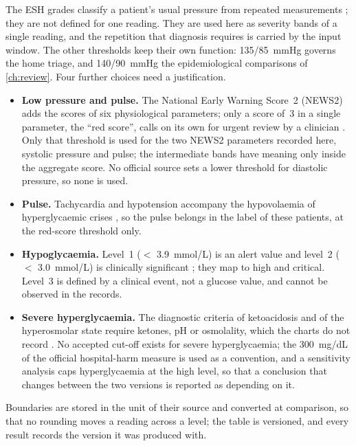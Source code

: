 \documentclass[11pt,a4paper,oneside]{report}
\begin{document}
The ESH grades classify a patient's usual pressure from repeated measurements \parencite{mancia2023}; they are not defined for one reading. They are used here as severity bands of a single reading, and the repetition that diagnosis requires is carried by the input window. The other thresholds keep their own function: 135/85~mmHg governs the home triage, and 140/90~mmHg the epidemiological comparisons of \cref{ch:review}. Four further choices need a justification.
\begin{itemize}
  \item \textbf{Low pressure and pulse.} The National Early Warning Score~2 (NEWS2) adds the scores of six physiological parameters; only a score of~3 in a single parameter, the ``red score'', calls on its own for urgent review by a clinician \parencite{rcp2017news2}. Only that threshold is used for the two NEWS2 parameters recorded here, systolic pressure and pulse; the intermediate bands have meaning only inside the aggregate score. No official source sets a lower threshold for diastolic pressure, so none is used.
  \item \textbf{Pulse.} Tachycardia and hypotension accompany the hypovolaemia of hyperglycaemic crises \parencite{umpierrez2024}, so the pulse belongs in the label of these patients, at the red-score threshold only.
  \item \textbf{Hypoglycaemia.} Level~1 ($<$ 3.9~mmol/L) is an alert value and level~2 ($<$ 3.0~mmol/L) is clinically significant \parencite{ihsg2017}; they map to high and critical. Level~3 is defined by a clinical event, not a glucose value, and cannot be observed in the records.
  \item \textbf{Severe hyperglycaemia.} The diagnostic criteria of ketoacidosis and of the hyperosmolar state require ketones, pH or osmolality, which the charts do not record \parencite{umpierrez2024}. No accepted cut-off exists for severe hyperglycaemia; the 300~mg/dL of the official hospital-harm measure \parencite{cms871} is used as a convention, and a sensitivity analysis caps hyperglycaemia at the high level, so that a conclusion that changes between the two versions is reported as depending on it.
\end{itemize}
Boundaries are stored in the unit of their source and converted at comparison, so that no rounding moves a reading across a level; the table is versioned, and every result records the version it was produced with.
\end{document}
